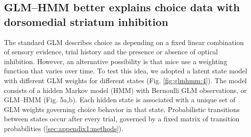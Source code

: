 \subsection{GLM–HMM better explains choice data with dorsomedial striatum inhibition}
\label{sec:glmhmm:2.2.7}

The standard GLM describes choice as depending on a fixed linear combination of sensory evidence, trial history and the presence or absence of optical inhibition. However, an alternative possibility is that mice use a weighting function that varies over time. To test this idea, we adopted a latent state model with different GLM weights for different states (Fig. \ref{fig:glmhmm:4}). The model consists of a hidden Markov model (HMM) with Bernoulli GLM observations, or GLM–HMM \cite{bengio_input_1994,escola_hidden_2011,calhoun_unsupervised_2019,ashwood_mice_2022} (Fig. 5a,b). Each hidden state is associated with a unique set of GLM weights governing choice behavior in that state. Probabilistic transitions between states occur after every trial, governed by a fixed matrix of transition probabilities (\ref{sec:appendix1:methods}).

